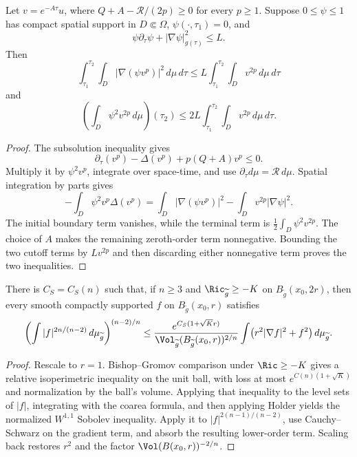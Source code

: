 \begin{lemma}
\label{lem:chow-iii-reverse-poincare}
Let \(v=e^{-A\tau}u\), where
\(Q+A-\mathcal R/(2p)\geq0\) for every \(p\geq1\).  Suppose
\(0\leq\psi\leq1\) has compact spatial support in \(D\Subset\Omega\),
\(\psi(\cdot,\tau_1)=0\), and
\[
 \psi\partial_\tau\psi+|\nabla\psi|_{g(\tau)}^2\leq L.
\]
Then
\[
 \int_{\tau_1}^{\tau_2}\int_D|\nabla(\psi v^p)|^2\,d\mu\,d\tau
 \leq L\int_{\tau_1}^{\tau_2}\int_Dv^{2p}\,d\mu\,d\tau
\]
and
\[
 \left(\int_D\psi^2v^{2p}\,d\mu\right)(\tau_2)
 \leq2L\int_{\tau_1}^{\tau_2}\int_Dv^{2p}\,d\mu\,d\tau.
\]
\end{lemma}
\begin{proof}
\sketch The subsolution inequality gives
\[
 \partial_\tau(v^p)-\Delta(v^p)+p(Q+A)v^p\leq0.
\]
Multiply it by \(\psi^2v^p\), integrate over space-time, and use
\(\partial_\tau d\mu=\mathcal R\,d\mu\).  Spatial integration by parts gives
\[
 -\int_D\psi^2v^p\Delta(v^p)
 =\int_D|\nabla(\psi v^p)|^2-\int_Dv^{2p}|\nabla\psi|^2.
\]
The initial boundary term vanishes, while the terminal term is
\(\frac12\int_D\psi^2v^{2p}\).  The choice of \(A\) makes the remaining
zeroth-order term nonnegative.  Bounding the two cutoff terms by \(Lv^{2p}\)
and then discarding either nonnegative term proves the two inequalities.
\end{proof}

\begin{proposition}
\label{prop:chow-iii-local-sobolev-ball}
There is \(C_S=C_S(n)\) such that, if \(n\geq3\) and
\(\Ric_{\widetilde g}\geq-K\) on \(B_{\widetilde g}(x_0,2r)\), then every
smooth compactly supported \(f\) on \(B_{\widetilde g}(x_0,r)\) satisfies
\[
 \left(\int |f|^{2n/(n-2)}\,d\mu_{\widetilde g}\right)^{(n-2)/n}
 \leq
 \frac{e^{C_S(1+\sqrt K r)}}
 {\Vol_{\widetilde g}(B_{\widetilde g}(x_0,r))^{2/n}}
 \int\bigl(r^2|\nabla f|^2+f^2\bigr)\,d\mu_{\widetilde g}.
\]
\end{proposition}
\begin{proof}
\sketch Rescale to \(r=1\).  Bishop--Gromov comparison under
\(\Ric\geq-K\) gives a relative isoperimetric inequality on the unit ball,
with loss at most \(e^{C(n)(1+\sqrt K)}\) and normalization by the ball's
volume.  Applying that inequality to the level sets of \(|f|\), integrating
with the coarea formula, and then applying Holder yields the normalized
\(W^{1,1}\) Sobolev inequality.  Apply it to
\(|f|^{2(n-1)/(n-2)}\), use Cauchy--Schwarz on the gradient term, and absorb
the resulting lower-order term.  Scaling back restores \(r^2\) and the
factor \(\Vol(B(x_0,r))^{-2/n}\).
\end{proof}

